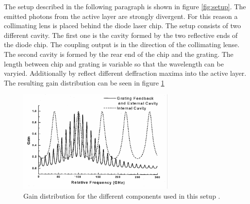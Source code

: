 The setup described in the following paragraph is shown in figure \ref{fig:setup}.
The emitted photons from the active layer are strongly divergent. For this reason
a collimating lens is placed behind the diode laser chip. The setup consists of
two different cavity. The first one is the cavity formed by the two reflective ends
of the diode chip. The coupling output is in the direction of the collimating lense.
The second cavity is formed by the rear end of the chip and the grating. The length
between chip and grating is variable so that the wavelength can be varyied. Additionally
by reflect different deffraction maxima into the active layer. The resulting
gain distribution can be seen in figure \ref{fig:gain}
\begin{figure}
  \centering
  \includegraphics[width = 0.7\textwidth]{Pics/gain.pdf}
  \caption{Gain distribution for the different components used in this setup \cite{anleitung}.}
  \label{fig:gain}
\end{figure}
